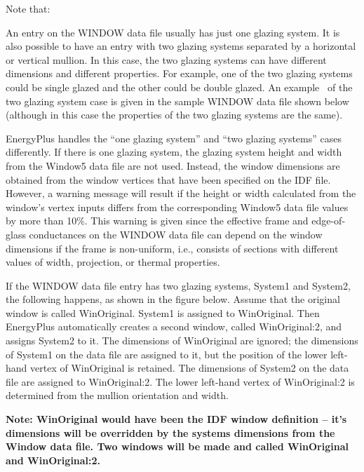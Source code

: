 Note that:

An entry on the WINDOW data file usually has just one glazing system. It is also possible to have an entry with two glazing systems separated by a horizontal or vertical mullion. In this case, the two glazing systems can have different dimensions and different properties. For example, one of the two glazing systems could be single glazed and the other could be double glazed. An example~ of the two glazing system case is given in the sample WINDOW data file shown below (although in this case the properties of the two glazing systems are the same).

EnergyPlus handles the ``one glazing system'' and ``two glazing systems'' cases differently. If there is one glazing system, the glazing system height and width from the Window5 data file are not used. Instead, the window dimensions are obtained from the window vertices that have been specified on the IDF file. However, a warning message will result if the height or width calculated from the window's vertex inputs differs from the corresponding Window5 data file values by more than 10\%. This warning is given since the effective frame and edge-of-glass conductances on the WINDOW data file can depend on the window dimensions if the frame is non-uniform, i.e., consists of sections with different values of width, projection, or thermal properties.

If the WINDOW data file entry has two glazing systems, System1 and System2, the following happens, as shown in the figure below. Assume that the original window is called WinOriginal. System1 is assigned to WinOriginal. Then EnergyPlus automatically creates a second window, called WinOriginal:2, and assigns System2 to it. The dimensions of WinOriginal are ignored; the dimensions of System1 on the data file are assigned to it, but the position of the lower left-hand vertex of WinOriginal is retained. The dimensions of System2 on the data file are assigned to WinOriginal:2. The lower left-hand vertex of WinOriginal:2 is determined from the mullion orientation and width.

\textbf{Note: WinOriginal would have been the IDF window definition -- it's dimensions will be overridden by the systems dimensions from the Window data file. Two windows will be made and called WinOriginal and WinOriginal:2.}

